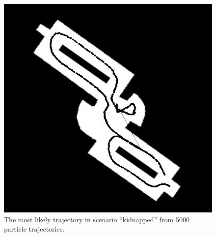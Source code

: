 \documentclass[11pt, a4paper]{article}
\begin{document}
\hspace{2em}
\begin{figure}[htbp]
\centering
\includegraphics[scale=0.4]{kidnapped.png}
\caption{The most likely trajectory in scenario ``kidnapped'' from 5000 particle trajectories.}
\label{fig:kidnapped}
\end{figure}
\end{document}
